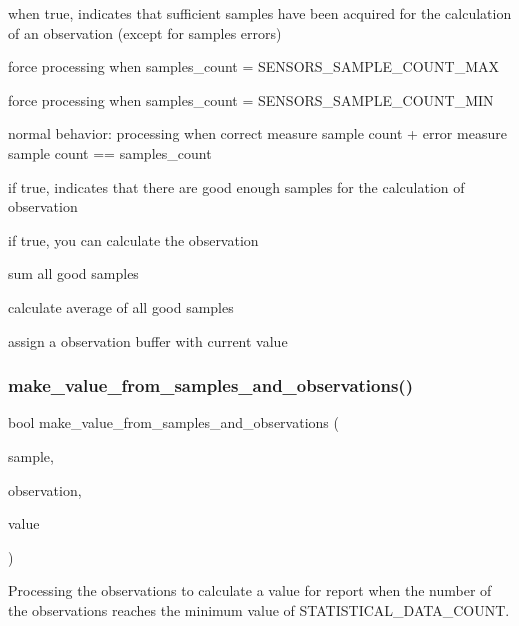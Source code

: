 when true, indicates that sufficient samples have been acquired for the calculation of an observation (except for samples errors)

force processing when samples\+\_\+count = S\+E\+N\+S\+O\+R\+S\+\_\+\+S\+A\+M\+P\+L\+E\+\_\+\+C\+O\+U\+N\+T\+\_\+\+M\+AX

force processing when samples\+\_\+count = S\+E\+N\+S\+O\+R\+S\+\_\+\+S\+A\+M\+P\+L\+E\+\_\+\+C\+O\+U\+N\+T\+\_\+\+M\+IN

normal behavior\+: processing when correct measure sample count + error measure sample count == samples\+\_\+count

if true, indicates that there are good enough samples for the calculation of observation

if true, you can calculate the observation

sum all good samples

calculate average of all good samples

assign a observation buffer with current value \mbox{\label{i2c-th_8ino_ab301e4d552826ef91458f52963949a1d}} 
\subsubsection{\texorpdfstring{make\+\_\+value\+\_\+from\+\_\+samples\+\_\+and\+\_\+observations()}{make\_value\_from\_samples\_and\_observations()}}
{\footnotesize\ttfamily bool make\+\_\+value\+\_\+from\+\_\+samples\+\_\+and\+\_\+observations (\begin{DoxyParamCaption}\item[{\hyperlink{structsample__t}{sample\+\_\+t} $\ast$}]{sample,  }\item[{\hyperlink{structobservation__t}{observation\+\_\+t} $\ast$}]{observation,  }\item[{volatile \hyperlink{structvalue__t}{value\+\_\+t} $\ast$}]{value }\end{DoxyParamCaption})}



Processing the observations to calculate a value for report when the number of the observations reaches the minimum value of S\+T\+A\+T\+I\+S\+T\+I\+C\+A\+L\+\_\+\+D\+A\+T\+A\+\_\+\+C\+O\+U\+NT. 


